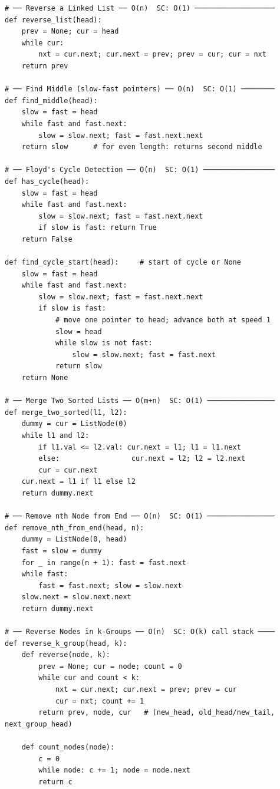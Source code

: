 \documentclass[11pt,a4paper]{report}
\begin{document}
\begin{lstlisting}
# ── Reverse a Linked List ── O(n)  SC: O(1) ───────────────────
def reverse_list(head):
    prev = None; cur = head
    while cur:
        nxt = cur.next; cur.next = prev; prev = cur; cur = nxt
    return prev

# ── Find Middle (slow-fast pointers) ── O(n)  SC: O(1) ────────
def find_middle(head):
    slow = fast = head
    while fast and fast.next:
        slow = slow.next; fast = fast.next.next
    return slow      # for even length: returns second middle

# ── Floyd's Cycle Detection ── O(n)  SC: O(1) ─────────────────
def has_cycle(head):
    slow = fast = head
    while fast and fast.next:
        slow = slow.next; fast = fast.next.next
        if slow is fast: return True
    return False

def find_cycle_start(head):     # start of cycle or None
    slow = fast = head
    while fast and fast.next:
        slow = slow.next; fast = fast.next.next
        if slow is fast:
            # move one pointer to head; advance both at speed 1
            slow = head
            while slow is not fast:
                slow = slow.next; fast = fast.next
            return slow
    return None

# ── Merge Two Sorted Lists ── O(m+n)  SC: O(1) ────────────────
def merge_two_sorted(l1, l2):
    dummy = cur = ListNode(0)
    while l1 and l2:
        if l1.val <= l2.val: cur.next = l1; l1 = l1.next
        else:                 cur.next = l2; l2 = l2.next
        cur = cur.next
    cur.next = l1 if l1 else l2
    return dummy.next

# ── Remove nth Node from End ── O(n)  SC: O(1) ────────────────
def remove_nth_from_end(head, n):
    dummy = ListNode(0, head)
    fast = slow = dummy
    for _ in range(n + 1): fast = fast.next
    while fast:
        fast = fast.next; slow = slow.next
    slow.next = slow.next.next
    return dummy.next

# ── Reverse Nodes in k-Groups ── O(n)  SC: O(k) call stack ────
def reverse_k_group(head, k):
    def reverse(node, k):
        prev = None; cur = node; count = 0
        while cur and count < k:
            nxt = cur.next; cur.next = prev; prev = cur
            cur = nxt; count += 1
        return prev, node, cur   # (new_head, old_head/new_tail, next_group_head)

    def count_nodes(node):
        c = 0
        while node: c += 1; node = node.next
        return c


\end{lstlisting}
\end{document}
